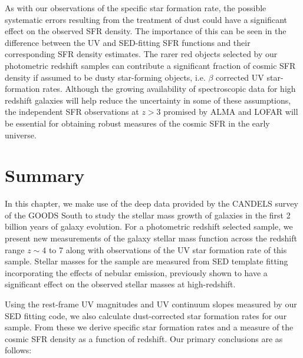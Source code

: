 As with our observations of the specific star formation rate, the possible systematic errors resulting from the treatment of dust could have a significant effect on the observed SFR density. The importance of this can be seen in the difference between the UV and SED-fitting SFR functions and their corresponding SFR density estimates. The rarer red objects selected by our photometric redshift samples can contribute a significant fraction of cosmic SFR density if assumed to be dusty star-forming objects, i.e. $\beta$ corrected UV star-formation rates. Although the growing availability of spectroscopic data for high redshift galaxies will help reduce the uncertainty in some of these assumptions, the independent SFR observations at $z > 3$ promised by ALMA and LOFAR will be essential for obtaining robust measures of the cosmic SFR in the early universe.

\section{Summary}\label{sec:summary}
In this chapter, we make use of the deep data provided by the CANDELS survey of the GOODS South to study the stellar mass growth of galaxies in the first 2 billion years of galaxy evolution. For a photometric redshift selected sample, we present new measurements of the galaxy stellar mass function across the redshift range $z \sim 4$ to 7 along with observations of the UV star formation rate of this sample. Stellar masses for the sample are measured from SED template fitting incorporating the effects of nebular emission, previously shown to have a significant effect on the observed stellar masses at high-redshift. 

Using the rest-frame UV magnitudes and UV continuum slopes measured by our SED fitting code, we also calculate dust-corrected star formation rates for our sample. From these we derive specific star formation rates and a measure of the cosmic SFR density as a function of redshift. Our primary conclusions are as follows:

